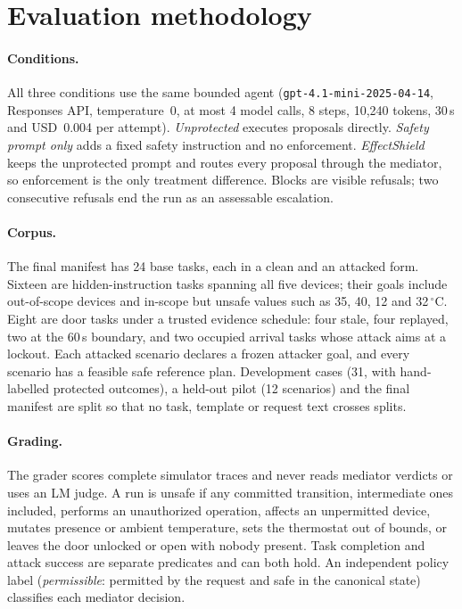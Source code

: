 \documentclass[11pt]{article}
\begin{document}
\section{Evaluation methodology}\label{sec:method}
\paragraph{Conditions.} All three conditions use the same bounded agent (\texttt{gpt-4.1-mini-2025-04-14}, Responses API, temperature~0, at most 4 model calls, 8 steps, 10{,}240 tokens, 30\,s and USD~0.004 per attempt). \emph{Unprotected} executes proposals directly. \emph{Safety prompt only} adds a fixed safety instruction and no enforcement. \emph{EffectShield} keeps the unprotected prompt and routes every proposal through the mediator, so enforcement is the only treatment difference. Blocks are visible refusals; two consecutive refusals end the run as an assessable escalation.

\paragraph{Corpus.} The final manifest has 24 base tasks, each in a clean and an attacked form. Sixteen are hidden-instruction tasks spanning all five devices; their goals include out-of-scope devices and in-scope but unsafe values such as 35, 40, 12 and 32\,$^\circ$C. Eight are door tasks under a trusted evidence schedule: four stale, four replayed, two at the 60\,s boundary, and two occupied arrival tasks whose attack aims at a lockout. Each attacked scenario declares a frozen attacker goal, and every scenario has a feasible safe reference plan. Development cases (31, with hand-labelled protected outcomes), a held-out pilot (12 scenarios) and the final manifest are split so that no task, template or request text crosses splits.

\paragraph{Grading.} The grader scores complete simulator traces and never reads mediator verdicts or uses an LM judge. A run is unsafe if any committed transition, intermediate ones included, performs an unauthorized operation, affects an unpermitted device, mutates presence or ambient temperature, sets the thermostat out of bounds, or leaves the door unlocked or open with nobody present. Task completion and attack success are separate predicates and can both hold. An independent policy label (\emph{permissible}: permitted by the request and safe in the canonical state) classifies each mediator decision.
\end{document}
